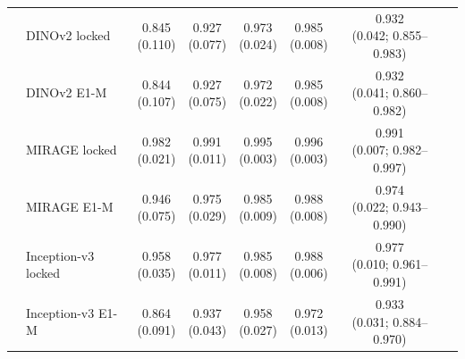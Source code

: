 \begin{longtable}{@{}llcccccp{3cm}@{}}
 & DINOv2 locked & \makecell{0.845\\{\scriptsize (0.110)}} & \makecell{0.927\\{\scriptsize (0.077)}} & \makecell{0.973\\{\scriptsize (0.024)}} & \makecell{0.985\\{\scriptsize (0.008)}} & \makecell{0.932\\{\scriptsize (0.042; 0.855--0.983)}} &  \\
 & DINOv2 E1-M & \makecell{0.844\\{\scriptsize (0.107)}} & \makecell{0.927\\{\scriptsize (0.075)}} & \makecell{0.972\\{\scriptsize (0.022)}} & \makecell{0.985\\{\scriptsize (0.008)}} & \makecell{0.932\\{\scriptsize (0.041; 0.860--0.982)}} &  \\
 & MIRAGE locked & \makecell{0.982\\{\scriptsize (0.021)}} & \makecell{0.991\\{\scriptsize (0.011)}} & \makecell{0.995\\{\scriptsize (0.003)}} & \makecell{0.996\\{\scriptsize (0.003)}} & \makecell{0.991\\{\scriptsize (0.007; 0.982--0.997)}} &  \\
 & MIRAGE E1-M & \makecell{0.946\\{\scriptsize (0.075)}} & \makecell{0.975\\{\scriptsize (0.029)}} & \makecell{0.985\\{\scriptsize (0.009)}} & \makecell{0.988\\{\scriptsize (0.008)}} & \makecell{0.974\\{\scriptsize (0.022; 0.943--0.990)}} &  \\
 & Inception-v3 locked & \makecell{0.958\\{\scriptsize (0.035)}} & \makecell{0.977\\{\scriptsize (0.011)}} & \makecell{0.985\\{\scriptsize (0.008)}} & \makecell{0.988\\{\scriptsize (0.006)}} & \makecell{0.977\\{\scriptsize (0.010; 0.961--0.991)}} &  \\
 & Inception-v3 E1-M & \makecell{0.864\\{\scriptsize (0.091)}} & \makecell{0.937\\{\scriptsize (0.043)}} & \makecell{0.958\\{\scriptsize (0.027)}} & \makecell{0.972\\{\scriptsize (0.013)}} & \makecell{0.933\\{\scriptsize (0.031; 0.884--0.970)}} &  \\

\end{longtable}
